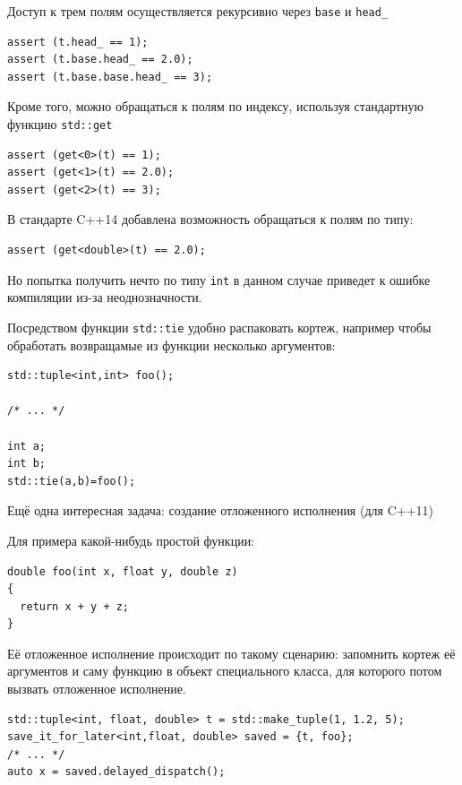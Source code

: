 \documentclass[a4paper,12pt,oneside]{article}
\begin{document}
Доступ к трем полям осуществляется рекурсивно через \lstinline!base! и \lstinline!head_!

\begin{lstlisting}
assert (t.head_ == 1);
assert (t.base.head_ == 2.0);
assert (t.base.base.head_ == 3);
\end{lstlisting}

Кроме того, можно обращаться к полям по индексу, используя стандартную функцию \lstinline!std::get!

\begin{lstlisting}
assert (get<0>(t) == 1);
assert (get<1>(t) == 2.0);
assert (get<2>(t) == 3);
\end{lstlisting}

В стандарте C++14 добавлена возможность обращаться к полям по типу:

\begin{lstlisting}
assert (get<double>(t) == 2.0);
\end{lstlisting}

Но попытка получить нечто по типу \lstinline!int! в данном случае приведет к ошибке компиляции из-за неоднозначности.

Посредством функции \lstinline!std::tie! удобно распаковать кортеж, например чтобы обработать возвращамые из функции несколько аргументов:

\begin{lstlisting}
std::tuple<int,int> foo();

/* ... */

int a;
int b;
std::tie(a,b)=foo();
\end{lstlisting}

Ещё одна интересная задача: создание отложенного исполнения (для C++11)

Для примера какой-нибудь простой функции:

\begin{lstlisting}
double foo(int x, float y, double z)
{
  return x + y + z;
}
\end{lstlisting}

Её отложенное исполнение происходит по такому сценарию: запомнить кортеж её аргументов и саму функцию в объект специального класса, для которого потом вызвать отложенное исполнение.

\begin{lstlisting}
std::tuple<int, float, double> t = std::make_tuple(1, 1.2, 5);
save_it_for_later<int,float, double> saved = {t, foo};
/* ... */
auto x = saved.delayed_dispatch();
\end{lstlisting}
\end{document}

